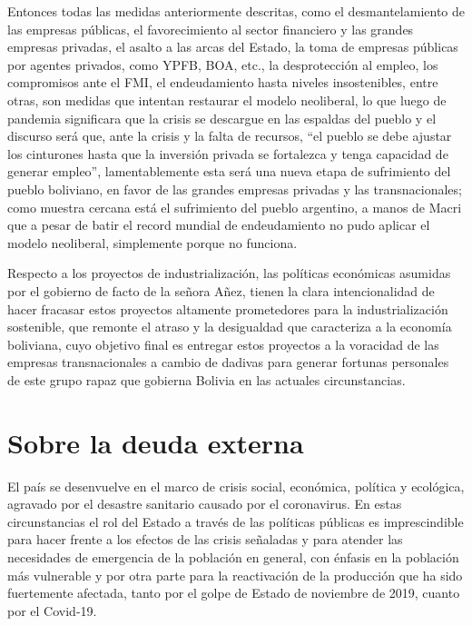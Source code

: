 \documentclass[a4paper, nobind]{templates/ociamthesis}
\begin{document}
Entonces todas las medidas anteriormente descritas, como el desmantelamiento de las empresas públicas, el favorecimiento al sector financiero y las grandes empresas privadas, el asalto a las arcas del Estado, la toma de empresas públicas por agentes privados, como YPFB, BOA, etc., la desprotección al empleo, los compromisos ante el FMI, el endeudamiento hasta niveles insostenibles, entre otras, son medidas que intentan restaurar el modelo neoliberal, lo que luego de pandemia significara que la crisis se descargue en las espaldas del pueblo y el discurso será que, ante la crisis y la falta de recursos, ``el pueblo se debe ajustar los cinturones hasta que la inversión privada se fortalezca y tenga capacidad de generar empleo'', lamentablemente esta será una nueva etapa de sufrimiento del pueblo boliviano, en favor de las grandes empresas privadas y las transnacionales; como muestra cercana está el sufrimiento del pueblo argentino, a manos de Macri que a pesar de batir el record mundial de endeudamiento no pudo aplicar el modelo neoliberal, simplemente porque no funciona.

Respecto a los proyectos de industrialización, las políticas económicas asumidas por el gobierno de facto de la señora Añez, tienen la clara intencionalidad de hacer fracasar estos proyectos altamente prometedores para la industrialización sostenible, que remonte el atraso y la desigualdad que caracteriza a la economía boliviana, cuyo objetivo final es entregar estos proyectos a la voracidad de las empresas transnacionales a cambio de dadivas para generar fortunas personales de este grupo rapaz que gobierna Bolivia en las actuales circunstancias.

\hypertarget{sobre-la-deuda-externa}{%
\chapter{Sobre la deuda externa}\label{sobre-la-deuda-externa}}

El país se desenvuelve en el marco de crisis social, económica, política y ecológica, agravado por el desastre sanitario causado por el coronavirus. En estas circunstancias el rol del Estado a través de las políticas públicas es imprescindible para hacer frente a los efectos de las crisis señaladas y para atender las necesidades de emergencia de la población en general, con énfasis en la población más vulnerable y por otra parte para la reactivación de la producción que ha sido fuertemente afectada, tanto por el golpe de Estado de noviembre de 2019, cuanto por el Covid-19.
\end{document}
